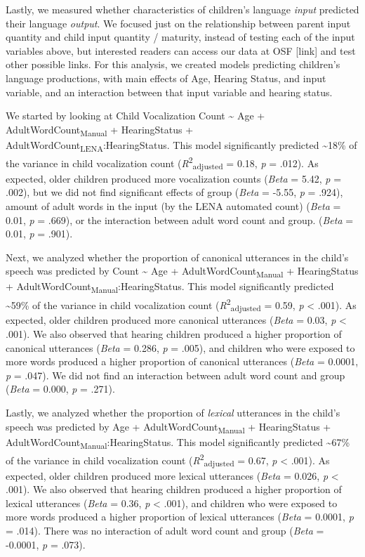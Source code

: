 \documentclass[
  man,floatsintext]{apa6}
\begin{document}
Lastly, we measured whether characteristics of children's language \emph{input} predicted their language \emph{output}. We focused just on the relationship between parent input quantity and child input quantity / maturity, instead of testing each of the input variables above, but interested readers can access our data at OSF {[}link{]} and test other possible links. For this analysis, we created models predicting children's language productions, with main effects of Age, Hearing Status, and input variable, and an interaction between that input variable and hearing status.

We started by looking at Child Vocalization Count \textasciitilde{} Age + AdultWordCount\textsubscript{Manual} + HearingStatus + AdultWordCount\textsubscript{LENA}:HearingStatus. This model significantly predicted \textasciitilde18\% of the variance in child vocalization count (\emph{R}\textsuperscript{2}\textsubscript{adjusted} = 0.18, \emph{p} = .012). As expected, older children produced more vocalization counts (\emph{Beta} = 5.42, \emph{p} = .002), but we did not find significant effects of group (\emph{Beta} = -5.55, \emph{p} = .924), amount of adult words in the input (by the LENA automated count) (\emph{Beta} = 0.01, \emph{p} = .669), or the interaction between adult word count and group. (\emph{Beta} = 0.01, \emph{p} = .901).

Next, we analyzed whether the proportion of canonical utterances in the child's speech was predicted by Count \textasciitilde{} Age + AdultWordCount\textsubscript{Manual} + HearingStatus + AdultWordCount\textsubscript{Manual}:HearingStatus. This model significantly predicted \textasciitilde59\% of the variance in child vocalization count (\emph{R}\textsuperscript{2}\textsubscript{adjusted} = 0.59, \emph{p} \textless{} .001). As expected, older children produced more canonical utterances (\emph{Beta} = 0.03, \emph{p} \textless{} .001). We also observed that hearing children produced a higher proportion of canonical utterances (\emph{Beta} = 0.286, \emph{p} = .005), and children who were exposed to more words produced a higher proportion of canonical utterances (\emph{Beta} = 0.0001, \emph{p} = .047). We did not find an interaction between adult word count and group (\emph{Beta} = 0.000, \emph{p} = .271).

Lastly, we analyzed whether the proportion of \emph{lexical} utterances in the child's speech was predicted by Age + AdultWordCount\textsubscript{Manual} + HearingStatus + AdultWordCount\textsubscript{Manual}:HearingStatus. This model significantly predicted \textasciitilde67\% of the variance in child vocalization count (\emph{R}\textsuperscript{2}\textsubscript{adjusted} = 0.67, \emph{p} \textless{} .001). As expected, older children produced more lexical utterances (\emph{Beta} = 0.026, \emph{p} \textless{} .001). We also observed that hearing children produced a higher proportion of lexical utterances (\emph{Beta} = 0.36, \emph{p} \textless{} .001), and children who were exposed to more words produced a higher proportion of lexical utterances (\emph{Beta} = 0.0001, \emph{p} = .014). There was no interaction of adult word count and group (\emph{Beta} = -0.0001, \emph{p} = .073).
\end{document}
